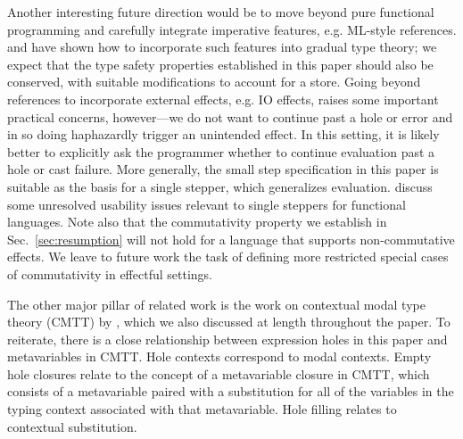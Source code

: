 %
Another interesting future direction would be to move beyond
pure functional programming and carefully integrate imperative features, e.g. ML-style references.
%
%
\citet{Siek06a} and \citet{DBLP:conf/esop/SiekVCTG15} have shown how to incorporate such features into gradual type theory; we expect that the type safety properties established in this paper should also be conserved, with suitable modifications to account for a store.
%
Going beyond references to incorporate external effects, e.g. IO effects, raises some important practical concerns, however---we do not want to continue past a hole or error and in so doing haphazardly trigger an unintended effect. In this setting, it is likely better to explicitly ask the programmer whether to continue evaluation past a hole or cast failure. More generally, the small step specification in this paper is suitable as the basis for a single stepper, which generalizes evaluation. \citet{ocaml-stepper} discuss some unresolved usability issues relevant to single steppers for functional languages. Note also that the commutativity property we establish in Sec.~\ref{sec:resumption} will not hold for a language that supports non-commutative effects. We leave to future work the task of defining more restricted special cases of commutativity in effectful settings.


The other major pillar of related work is the work on contextual modal type theory (CMTT) by \citet{Nanevski2008}, which we also discussed at length throughout the paper. To reiterate, there is a close relationship between expression holes in this paper and metavariables in CMTT. Hole contexts correspond to modal contexts.
Empty hole closures 
relate to the concept of a {metavariable closure} in CMTT, which consists
of a metavariable paired with a substitution for all of the variables in the
typing context associated with that metavariable. Hole filling relates to contextual substitution. 

